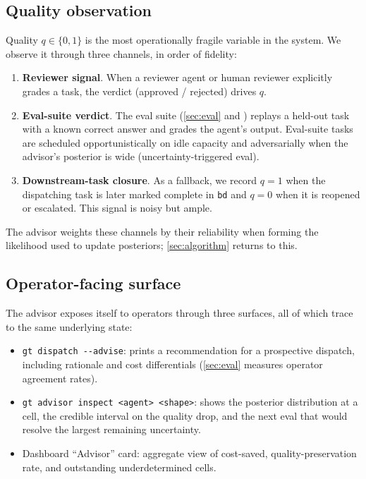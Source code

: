 \subsection{Quality observation}

Quality $q \in \{0, 1\}$ is the most operationally fragile variable in the
system. We observe it through three channels, in order of fidelity:

\begin{enumerate}[leftmargin=*]
  \item \textbf{Reviewer signal}. When a reviewer agent or human reviewer
        explicitly grades a task, the verdict (approved / rejected) drives $q$.
  \item \textbf{Eval-suite verdict}. The eval suite (\cref{sec:eval} and
        \cite{blackrim_moa11}) replays a held-out task with a known correct
        answer and grades the agent's output. Eval-suite tasks are scheduled
        opportunistically on idle capacity and adversarially when the
        advisor's posterior is wide (uncertainty-triggered eval).
  \item \textbf{Downstream-task closure}. As a fallback, we record $q = 1$
        when the dispatching task is later marked complete in \texttt{bd}
        and $q = 0$ when it is reopened or escalated. This signal is noisy
        but ample.
\end{enumerate}

The advisor weights these channels by their reliability when forming the
likelihood used to update posteriors; \cref{sec:algorithm} returns to this.

\subsection{Operator-facing surface}

The advisor exposes itself to operators through three surfaces, all of which
trace to the same underlying state:

\begin{itemize}[leftmargin=*]
  \item \texttt{gt dispatch -{}-advise}: prints a recommendation for a
        prospective dispatch, including rationale and cost differentials
        (\cref{sec:eval} measures operator agreement rates).
  \item \texttt{gt advisor inspect <agent> <shape>}: shows the posterior
        distribution at a cell, the credible interval on the quality drop,
        and the next eval that would resolve the largest remaining
        uncertainty.
  \item Dashboard ``Advisor'' card: aggregate view of cost-saved,
        quality-preservation rate, and outstanding underdetermined cells.
\end{itemize}

